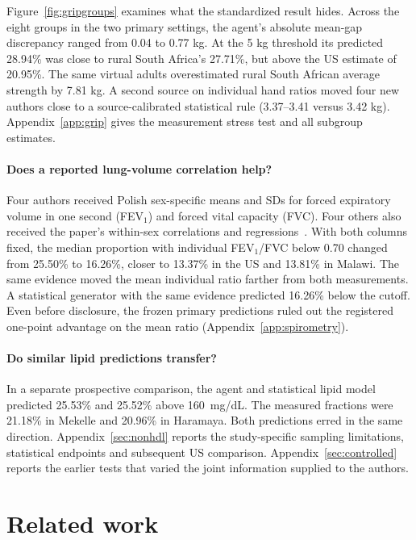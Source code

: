 \documentclass[sigconf,anonymous,review]{acmart}
\begin{document}
Figure~\ref{fig:gripgroups} examines what the standardized result hides. Across the eight groups in the two primary settings, the agent's absolute mean-gap discrepancy ranged from 0.04 to 0.77 kg. At the 5 kg threshold its predicted 28.94\% was close to rural South Africa's 27.71\%, but above the US estimate of 20.95\%. The same virtual adults overestimated rural South African average strength by 7.81 kg. A second source on individual hand ratios moved four new authors close to a source-calibrated statistical rule (3.37--3.41 versus 3.42 kg). Appendix~\ref{app:grip} gives the measurement stress test and all subgroup estimates.

\paragraph{Does a reported lung-volume correlation help?}
Four authors received Polish sex-specific means and SDs for forced expiratory volume in one second (FEV$_1$) and forced vital capacity (FVC). Four others also received the paper's within-sex correlations and regressions~\cite{polishspi}. With both columns fixed, the median proportion with individual FEV$_1$/FVC below 0.70 changed from 25.50\% to 16.26\%, closer to 13.37\% in the US and 13.81\% in Malawi. The same evidence moved the mean individual ratio farther from both measurements. A statistical generator with the same evidence predicted 16.26\% below the cutoff. Even before disclosure, the frozen primary predictions ruled out the registered one-point advantage on the mean ratio (Appendix~\ref{app:spirometry}).

\paragraph{Do similar lipid predictions transfer?}
In a separate prospective comparison, the agent and statistical lipid model predicted 25.53\% and 25.52\% above 160~mg/dL. The measured fractions were 21.18\% in Mekelle and 20.96\% in Haramaya. Both predictions erred in the same direction. Appendix~\ref{sec:nonhdl} reports the study-specific sampling limitations, statistical endpoints and subsequent US comparison. Appendix~\ref{sec:controlled} reports the earlier tests that varied the joint information supplied to the authors.

\section{Related work}
\end{document}
